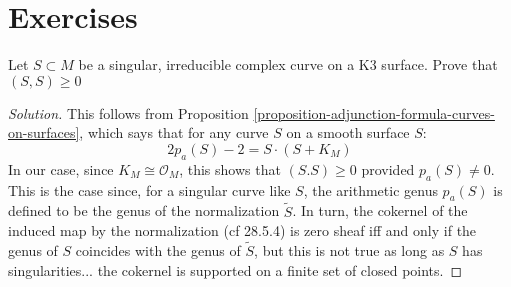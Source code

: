 \section{Exercises}
\label{section-exercises}

\begin{exercise}
\label{exercise-k3-2.7}
Let $S \subset M$ be a singular, irreducible complex curve on a K3 surface.
Prove that $(S,S)\geq 0$
\end{exercise}

\begin{proof}[Solution]
This follows from Proposition 
\ref{proposition-adjunction-formula-curves-on-surfaces}, which says that
for any curve $S$ on a smooth surface $S$:
$$
2p_a(S)-2=S\cdot (S+K_M)
$$
In our case, since $K_M \cong\mathcal{O}_M$, this shows that $(S.S)\geq 0$
provided $p_a(S) \neq 0$. This is the case since, for a singular curve like $S$,
the arithmetic genus $p_a(S)$ is defined to be the genus of the normalization
 $\tilde{S}$. In turn, the cokernel of the induced map by the normalization
(cf \cite{sea} 28.5.4) is zero sheaf iff and only if the genus of $S$ coincides
with the genus of $\tilde{S}$, but this is not true as long as $S$ has
singularities... the cokernel is supported on a finite set of closed points.
\end{proof}
